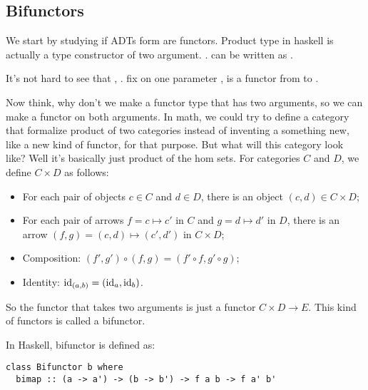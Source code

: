 \setcounter{section}{7}
\setcounter{subsection}{0}
\subsection{Bifunctors}

We start by studying if ADTs form are functors. Product type in haskell is
actually a type constructor of two argument. \ie.  can be written as
.

It's not hard to see that , \ie. fix on one parameter , is a
functor from  to .

\begin{center}
\end{center}

Now think, why don't we make a functor type that has two arguments, so we can
make \code{(,)} a functor on both arguments. In math, we could try to define
a category that formalize product of two categories instead of inventing a
something new, like a new kind of functor, for that purpose.
But what will this category look like? Well it's basically just product of the
hom sets. For categories $C$ and $D$, we define $C \times D$ as follows:

\begin{itemize}
\item For each pair of objects $c\in C$ and $d\in D$, there is an object $(c,d)
  \in C\times D$;
\item For each pair of arrows $f=c\mapsto c'$ in $C$ and $g
  = d\mapsto d'$ in $D$, there is an arrow $(f, g)=(c,d)\mapsto (c',d')$ in $C\times D$;
\item Composition: $(f', g') \circ (f, g) = (f'\circ f, g'\circ g)$;
\item Identity: $\mathrm{id}_{(a,b)}=(\mathrm{id}_a, \mathrm{id}_b)$.
\end{itemize}

So the functor that takes two arguments is just a functor $C\times
D \to E$. This kind of functors is called a bifunctor.

In Haskell, bifunctor is defined as:

\begin{lstlisting}
class Bifunctor b where
  bimap :: (a -> a') -> (b -> b') -> f a b -> f a' b'
\end{lstlisting}

